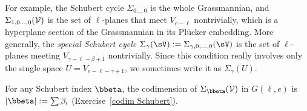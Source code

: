  
For example, the Schubert cycle $\Sigma_{0\dots,0}$ is the whole Grassmannian, 
and $\Sigma_{1,0\dots,0}(\cal V)$ is the set of $\ell$-planes that meet $V_{e-\ell}$ nontrivially, which is
a hyperplane section of the Grassmannian in its Pl\"ucker embedding. 
More generally, the
\emph{special Schubert cycle} 
$\Sigma_\gamma(\sV) := \Sigma_{\gamma,0,\dots, 0}(\sV)$ 
is the set of $\ell$-planes
meeting  $V_{\gamma-\ell - \beta+1}$ nontrivially.
Since this condition really involves only the single space $U = V_{e-\ell-\gamma+1}$, we sometimes 
 write it
as $\Sigma_\gamma(U)$. 

For any Schubert index $\bbeta$, the codimension of $\Sigma_{\bbeta}({\cal V})$ in $G(\ell, e)$ is $|{\bbeta}|:= \sum \beta_i$
(Exercise~\ref{codim Schubert}).

%



